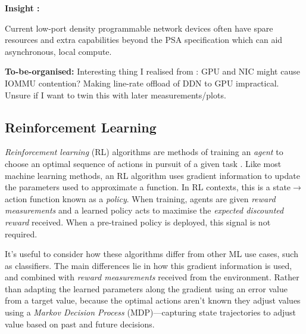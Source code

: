 \documentclass[sigconf,natbib=false]{acmart}
\newcommand{\fakepara}[1]{\noindent\textbf{#1:}}
\newcounter{insightc}
\newenvironment{insight}
	{
		\begin{tipblock}\refstepcounter{insightc}\textbf{Insight \theinsightc:}\em
	}
	{
		\end{tipblock}
	}
\begin{document}
\begin{insight}
	Current low-port density programmable network devices often have spare resources and extra capabilities beyond the PSA specification which can aid asynchronous, local compute.
\end{insight}

\fakepara{To-be-organised}
Interesting thing I realised from \textcite{DBLP:conf/sigcomm/NeugebauerAZAL018}: GPU and NIC might cause IOMMU contention? Making line-rate offload of DDN to GPU impractical. Unsure if I want to twin this with later measurements/plots.

\subsection{Reinforcement Learning}
\emph{Reinforcement learning} (RL) algorithms are methods of training an \emph{agent} to choose an optimal sequence of actions in pursuit of a given task \cite{RL2E}.
Like most machine learning methods, an RL algorithm uses gradient information to update the parameters used to approximate a function.
In RL contexts, this is a state$\rightarrow$action function known as a \emph{policy}.
When training, agents are given \emph{reward measurements} and a learned policy acts to maximise the \emph{expected discounted reward} received.
When a pre-trained policy is deployed, this signal is not required.

It's useful to consider how these algorithms differ from other ML use cases, such as classifiers.
The main differences lie in how this gradient information is used, and combined with \emph{reward measurements} received from the environment.
Rather than adapting the learned parameters along the gradient using an error value from a target value, because the optimal actions aren't known they adjust values using a \emph{Markov Decision Process} (MDP)---capturing state trajectories to adjust value based on past and future decisions.
\end{document}
